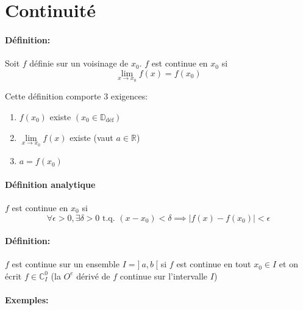\documentclass[
    11pt,
    a4paper,
    oneside,
    headinlcude, footinclude,
    twoside,
]{report}
\newcommand{\tq}[0]{\textrm{ t.q. }}
\begin{document}
\section{Continuité}

\paragraph{Définition:}

Soit $f$ définie sur un voisinage de $x_{0}$. $f$ est continue en $x_{0}$ si $$\lim_{x \to x_{0}} f(x)
= f (x_{0})$$

Cette définition comporte 3 exigences:
\begin{enumerate}
\item $f (x_{0})$ existe $(x_{0} \in \mathbb{D}_{\text{déf}})$
\item $\lim\limits_{x \to x_{0}} f (x)$ existe (vaut $a \in \mathbb{R}$)
\item $a = f (x_{0})$
\end{enumerate}

\paragraph{Définition analytique}
\label{par:definition_analytique}

$f$ est continue en $x_{0}$ si $$\forall \epsilon > 0, \exists \delta > 0 \tq
(x - x_{0}) < \delta \implies |f (x) - f (x_{0})| < \epsilon$$


\paragraph{Définition:}

$f$ est continue sur un ensemble $I = ]\ a, b\ [$ si $f$ est continue en tout
$x_{0} \in I$ et on écrit $f \in \mathbb{C}^{0}_{I}$ (la $O^e$ dérivé de $f$
continue sur l'intervalle $I$)


\paragraph{Exemples:}
\end{document}
